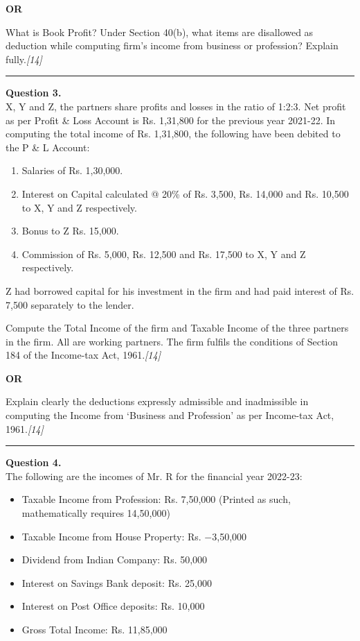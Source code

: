 \documentclass[11pt,a4paper]{article}
\newcommand{\pts}[1]{\hfill   \textit{[#1]}}
\begin{document}
\centerline{   \textbf{OR}}

What is Book Profit? Under Section 40(b), what items are disallowed as deduction while computing firm's income from business or profession? Explain fully.\pts{14}

\medskip\rule{\linewidth}{0.2pt}




\noindent   \textbf{Question 3.} \\
X, Y and Z, the partners share profits and losses in the ratio of 1:2:3. Net profit as per Profit \& Loss Account is Rs. 1,31,800 for the previous year 2021-22. In computing the total income of Rs. 1,31,800, the following have been debited to the P \& L Account:

\begin{enumerate}
  \item Salaries of Rs. 1,30,000.
  \item Interest on Capital calculated @ 20\% of Rs. 3,500, Rs. 14,000 and Rs. 10,500 to X, Y and Z respectively.
  \item Bonus to Z Rs. 15,000.
  \item Commission of Rs. 5,000, Rs. 12,500 and Rs. 17,500 to X, Y and Z respectively.
\end{enumerate}
Z had borrowed capital for his investment in the firm and had paid interest of Rs. 7,500 separately to the lender.

Compute the Total Income of the firm and Taxable Income of the three partners in the firm. All are working partners. The firm fulfils the conditions of Section 184 of the Income-tax Act, 1961.\pts{14}

\centerline{   \textbf{OR}}

Explain clearly the deductions expressly admissible and inadmissible in computing the Income from `Business and Profession' as per Income-tax Act, 1961.\pts{14}

\medskip\rule{\linewidth}{0.2pt}

\pagebreak




\noindent   \textbf{Question 4.} \\
The following are the incomes of Mr. R for the financial year 2022-23:

\begin{itemize}
  \item Taxable Income from Profession: Rs. 7,50,000 (Printed as such, mathematically requires 14,50,000)
  \item Taxable Income from House Property: Rs. $-$3,50,000
  \item Dividend from Indian Company: Rs. 50,000
  \item Interest on Savings Bank deposit: Rs. 25,000
  \item Interest on Post Office deposits: Rs. 10,000
  \item Gross Total Income: Rs. 11,85,000
\end{itemize}
\end{document}
